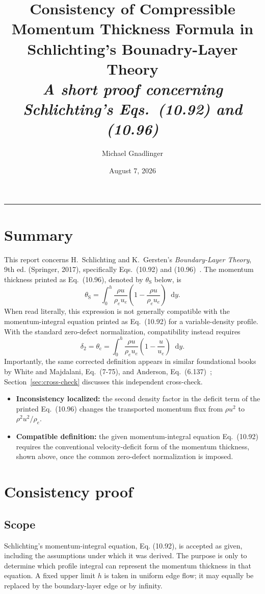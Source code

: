 \documentclass[11pt]{article}
\title{\vspace{-3em}\textcolor{HypBlue}{Consistency of Compressible Momentum Thickness Formula in Schlichting's Bounadry-Layer Theory}\\[1.2em]
\large\textit{A short proof concerning Schlichting's Eqs.~(10.92) and (10.96)}\vspace{-1em}}
\author{Michael Gnadlinger}
\date{August 7, 2026}
\newcommand{\note}[2]{%
  \vspace{0.3em}%
  \noindent\colorbox{#1}{%
    \begin{minipage}{0.965\linewidth}
      #2
    \end{minipage}}%
  \vspace{0.3em}%
}
\newcommand{\dd}{\mathop{}\!\mathrm{d}}
\newcommand{\rhoe}{\rho_e}
\newcommand{\ue}{u_e}
\newcommand{\theC}{\theta_{\mathrm c}}
\newcommand{\theS}{\theta_{\mathrm S}}
\begin{document}
\maketitle
\vspace{-1em}
\hrule
\vspace{-1em}

\section{Summary}
\label{sec:summary}

This report concerns H.~Schlichting and K.~Gersten's \emph{Boundary-Layer
Theory}, 9th ed. (Springer, 2017), specifically Eqs.~(10.92) and
(10.96)~\cite{Schlichting2017}. The momentum thickness printed as Eq.~(10.96),
denoted by $\theS$ below, is
\[
 \theS=\int_0^h\frac{\rho u}{\rhoe\ue}
 \left(1-\frac{\rho u}{\rhoe\ue}\right)\dd y.
\]
When read literally, this expression is not generally compatible with the
momentum-integral equation printed as Eq.~(10.92) for a variable-density
profile. With the standard zero-defect normalization, compatibility instead
requires
\[
 \delta_2=\theC=
 \int_0^h\frac{\rho u}{\rhoe\ue}
 \left(1-\frac{u}{\ue}\right)\dd y.
\]
Importantly, the same corrected definition appears in similar foundational
books by White and Majdalani, Eq.~(7-75), and Anderson,
Eq.~(6.137)~\cite{White2022,Anderson2006};
Section~\ref{sec:cross-check} discusses this independent cross-check.

\note{HypLightBlue}{%
\begin{itemize}
    \item \textbf{Inconsistency localized:} the second density factor in the
    deficit term of the printed Eq.~(10.96) changes the transported momentum
    flux from $\rho u^2$ to $\rho^2u^2/\rhoe$.
    \item \textbf{Compatible definition:} the given momentum-integral equation Eq.~(10.92) requires the conventional
    velocity-deficit form of the momentum thickness, shown above, once the common zero-defect normalization
    is imposed.
\end{itemize}
}

\section{Consistency proof}
\label{sec:proof}

\subsection*{Scope}
Schlichting's momentum-integral equation, Eq. (10.92), is accepted as given,
including the assumptions under which it was derived. The purpose is only to
determine which profile integral can represent the momentum thickness in that
equation. A fixed upper limit $h$ is taken in uniform edge flow; it may equally
be replaced by the boundary-layer edge or by infinity.
\end{document}
